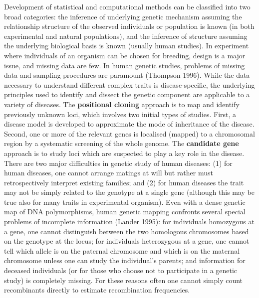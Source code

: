 Development of statistical and computational methods can be classified into two
broad categories:  the inference of underlying genetic mechanism assuming the
relationship structure of the observed individuals or population is known (in
both experimental and natural populations), and the inference of structure
assuming the underlying biological basis is known (usually human studies).  In
experiment where individuals of an organism can be chosen for breeding, design
is a major issue, and missing data are few.  In human genetic studies, problems
of missing data and sampling procedures are paramount (Thompson 1996).  While
the data necessary to understand different complex traits is disease-specific,
the underlying principles used to identify and dissect the genetic component
are applicable to a variety of diseases.  The {\bf positional cloning} approach
is to map and identify previously unknown loci, which involves two initial
types of studies.  First, a disease model is developed to approximate the mode
of inheritance of the disease.  Second, one or more of the relevant genes is
localised (mapped) to a chromosomal region by a systematic screening of the
whole genome.  The {\bf candidate gene} approach is to study loci which are
suspected to play a key role in the disease.  There are two major difficulties
in genetic study of human diseases:  (1) for human diseases, one cannot arrange
matings at will but rather must retrospectively interpret existing families;
and (2) for human diseases the trait may not be simply related to the genotype
at a single gene (although this may be true also for many traits in
experimental organism).  Even with a dense genetic map of {DNA} polymorphisms,
human genetic mapping confronts several special problems of incomplete
information (Lander 1995):  for individuals homozygous at a gene, one cannot
distinguish between the two homologous chromosomes based on the genotype at
the locus; for individuals heterozygous at a gene, one cannot tell which allele
is on the paternal chromosome and which is on the maternal chromosome unless
one can study the individual's parents; and information for deceased
individuals (or for those who choose not to participate in a genetic study) is
completely missing. For these reasons often one cannot simply count
recombinants directly to estimate recombination frequencies.


